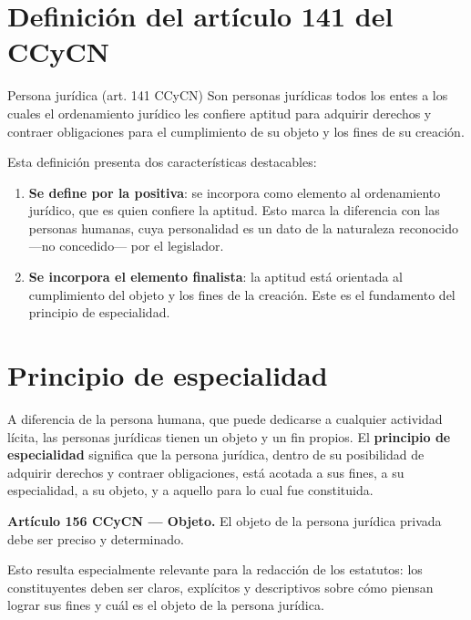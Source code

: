 \documentclass[12pt,oneside]{book}
\begin{document}
\section{Definición del artículo 141 del CCyCN}

\begin{definition}{Persona jurídica (art. 141 CCyCN)}
Son personas jurídicas todos los entes a los cuales el ordenamiento jurídico les confiere aptitud para adquirir derechos y contraer obligaciones para el cumplimiento de su objeto y los fines de su creación.
\end{definition}

Esta definición presenta dos características destacables:

\begin{enumerate}
    \item \textbf{Se define por la positiva}: se incorpora como elemento al ordenamiento jurídico, que es quien confiere la aptitud. Esto marca la diferencia con las personas humanas, cuya personalidad es un dato de la naturaleza reconocido —no concedido— por el legislador.
    \item \textbf{Se incorpora el elemento finalista}: la aptitud está orientada al cumplimiento del objeto y los fines de la creación. Este es el fundamento del principio de especialidad.
\end{enumerate}

\section{Principio de especialidad}

A diferencia de la persona humana, que puede dedicarse a cualquier actividad lícita, las personas jurídicas tienen un objeto y un fin propios. El \textbf{principio de especialidad} significa que la persona jurídica, dentro de su posibilidad de adquirir derechos y contraer obligaciones, está acotada a sus fines, a su especialidad, a su objeto, y a aquello para lo cual fue constituida.

\begin{important}
\textbf{Artículo 156 CCyCN --- Objeto.} El objeto de la persona jurídica privada debe ser preciso y determinado.
\end{important}

Esto resulta especialmente relevante para la redacción de los estatutos: los constituyentes deben ser claros, explícitos y descriptivos sobre cómo piensan lograr sus fines y cuál es el objeto de la persona jurídica.
\end{document}
